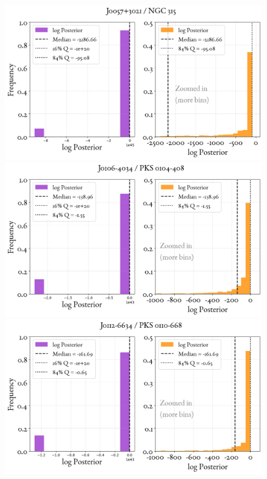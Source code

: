 \begin{figure}
    \centering
    \includegraphics[width=0.8\linewidth]{figures/ResultPosteriors/3_Posterior_128.png}\\
     \includegraphics[width=0.8\linewidth]{figures/ResultPosteriors/5_Posterior_145.png}\\
      \includegraphics[width=0.8\linewidth]{figures/ResultPosteriors/6_Posterior_162.png}  
\end{figure}

